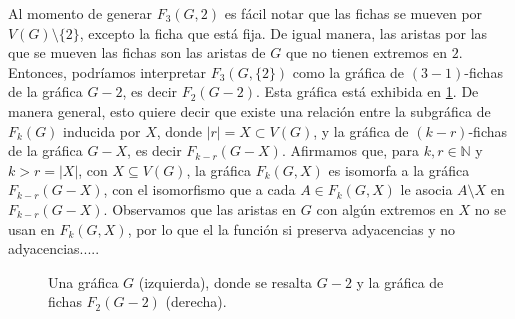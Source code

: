 Al momento de generar $F_3(G,2)$ es f\'acil notar que las fichas se mueven
por $V(G) \setminus \{2\}$, excepto la ficha que est\'a fija. De igual manera,
las aristas por las que se mueven las fichas son las aristas de $G$ que no
tienen extremos en $2$. Entonces, podr\'iamos interpretar $F_3(G,\{2\})$ como la
gr\'afica de $(3-1)$-fichas de la gr\'afica $G-2$, es decir $F_2(G-2)$. Esta
gr\'afica est\'a exhibida en \cref{fig:ex-tok-subgraph-aux}. De manera general,
esto quiere decir que existe una relaci\'on entre la subgr\'afica de $F_k(G)$
inducida por $X$, donde $|r|=X \subset V(G)$, y la gr\'afica de $(k-r)$-fichas
de la gr\'afica $G-X$, es decir $F_{k-r}(G-X)$. Afirmamos que, para $k,r \in
\mathbb{N}$ y $k>r = |X|$, con $X \subseteq V(G)$, la gr\'afica $F_k(G,X)$ es
isomorfa a la gr\'afica $F_{k-r}(G-X)$, con el isomorfismo que a cada $A \in
F_k(G,X)$ le asocia $A \setminus X$ en $F_{k-r}(G-X)$.   Observamos que las
aristas en $G$ con alg\'un extremos en $X$ no se usan en $F_k(G,X)$, por lo que
el la funci\'on si preserva adyacencias y no adyacencias..... 

\begin{figure}[ht!]
    \centering
    \caption{Una gr\'afica $G$ (izquierda), donde se resalta $G-2$ y la 
    gr\'afica de fichas $F_2(G-2)$ (derecha).}
    \label{fig:ex-tok-subgraph-aux}
\end{figure}
